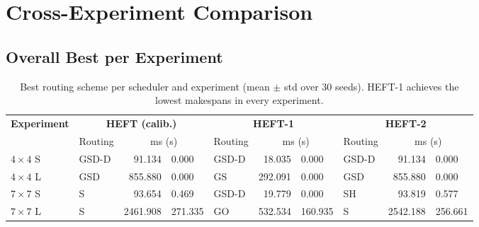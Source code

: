 \documentclass[11pt]{article}
\begin{document}
\section{Cross-Experiment Comparison}

\subsection{Overall Best per Experiment}

\begin{table}[H]
\centering
\begin{tabular}{l l r@{$\,\pm\,$}l l r@{$\,\pm\,$}l l r@{$\,\pm\,$}l}
\toprule
\textbf{Experiment} & \multicolumn{3}{c}{\textbf{HEFT (calib.)}} & \multicolumn{3}{c}{\textbf{HEFT-1}} & \multicolumn{3}{c}{\textbf{HEFT-2}} \\
\cmidrule(lr){2-4}\cmidrule(lr){5-7}\cmidrule(lr){8-10}
 & Routing & \multicolumn{2}{c}{ms (s)} & Routing & \multicolumn{2}{c}{ms (s)} & Routing & \multicolumn{2}{c}{ms (s)} \\
\midrule
$4\times4$ S & GSD-D & 91.134 & 0.000 & GSD-D & 18.035 & 0.000 & GSD-D & 91.134 & 0.000 \\
$4\times4$ L & GSD & 855.880 & 0.000 & GS & 292.091 & 0.000 & GSD & 855.880 & 0.000 \\
$7\times7$ S & S & 93.654 & 0.469 & GSD-D & 19.779 & 0.000 & SH & 93.819 & 0.577 \\
$7\times7$ L & S & 2461.908 & 271.335 & GO & 532.534 & 160.935 & S & 2542.188 & 256.661 \\
\bottomrule
\end{tabular}
\caption{Best routing scheme per scheduler and experiment (mean $\pm$ std over 30 seeds). HEFT-1 achieves the lowest makespans in every experiment.}
\end{table}
\end{document}
